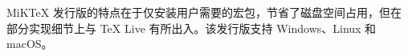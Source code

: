 \section{}
\label{sec:mik}

MiKTeX 发行版的特点在于仅安装用户需要的宏包，节省了磁盘空间占用，但在部分实现细节上与 TeX Live 有所出入。该发行版支持 Windows、Linux 和 macOS。

\zhlipsum
